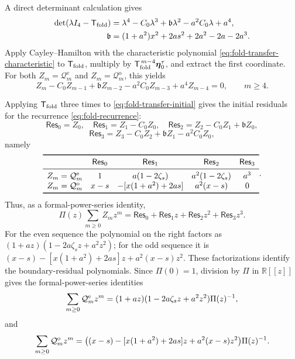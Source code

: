 \documentclass[11pt,a4paper]{article}
\numberwithin{equation}{section}
\begin{document}
A direct determinant calculation gives
\begin{equation}\label{eq:fold-transfer-characteristic}
\begin{aligned}
 \det(\lambda I_4-\mathsf T_{\rm fold})
 &=
 \lambda^4-C_0\lambda^3+\mathfrak b\lambda^2
 -a^2C_0\lambda+a^4,\\
 \mathfrak b
 &=(1+a^2)x^2+2as^2+2a^2-2a-2a^3.
\end{aligned}
\end{equation}
Apply Cayley--Hamilton with the characteristic polynomial
\eqref{eq:fold-transfer-characteristic} to \(\mathsf T_{\rm fold}\), multiply by
\(\mathsf T_{\rm fold}^{\,m-4}\boldsymbol\eta_0^\tau\), and extract the
first coordinate.  For both \(Z_m=\mathcal Q_m^{\mathrm e}\) and
\(Z_m=\mathcal Q_m^{\mathrm o}\), this yields
\begin{equation}\label{eq:fold-recurrence}
 Z_m-C_0Z_{m-1}+\mathfrak bZ_{m-2}
 -a^2C_0Z_{m-3}+a^4Z_{m-4}=0,
 \qquad m\geq4.
\end{equation}

Applying \(\mathsf T_{\rm fold}\) three times to
\eqref{eq:fold-transfer-initial} gives the initial residuals for the
recurrence \eqref{eq:fold-recurrence}:
\[
 \mathsf{Res}_0=Z_0,\quad
 \mathsf{Res}_1=Z_1-C_0Z_0,\quad
 \mathsf{Res}_2=Z_2-C_0Z_1+\mathfrak bZ_0,
\]
\[
 \mathsf{Res}_3
 =Z_3-C_0Z_2+\mathfrak bZ_1-a^2C_0Z_0,
\]
namely
\[
\begin{array}{ccccc}
 \toprule
 &\mathsf{Res}_0&\mathsf{Res}_1&\mathsf{Res}_2&\mathsf{Res}_3\\ \midrule
 Z_m=\mathcal Q_m^{\rm e}
 &1&a(1-2\zeta_s)&a^2(1-2\zeta_s)&a^3\\
 Z_m=\mathcal Q_m^{\rm o}
 &x-s&-[x(1+a^2)+2as]&a^2(x-s)&0\\
 \bottomrule
\end{array}.
\]
Thus, as a formal-power-series identity,
\[
 \Pi(z)\sum_{m\geq0}Z_mz^m
 =\mathsf{Res}_0+\mathsf{Res}_1z+\mathsf{Res}_2z^2+\mathsf{Res}_3z^3.
\]
For the even sequence the polynomial on the right factors as
\((1+az)(1-2a\zeta_sz+a^2z^2)\); for the odd sequence it is
\((x-s)-[x(1+a^2)+2as]z+a^2(x-s)z^2\).  These factorizations identify the
boundary-residual polynomials.  Since \(\Pi(0)=1\), division by \(\Pi\) in
\(\mathbb R[[z]]\) gives the formal-power-series identities
\begin{equation}\label{eq:fold-generating-even}
 \sum_{m\geq0}\mathcal Q_m^{\rm e}z^m
 =(1+az)(1-2a\zeta_sz+a^2z^2)\Pi(z)^{-1},
\end{equation}
and
\begin{equation}\label{eq:fold-generating-odd}
 \sum_{m\geq0}\mathcal Q_m^{\rm o}z^m
 =\bigl((x-s)-[x(1+a^2)+2as]z+a^2(x-s)z^2\bigr)
  \Pi(z)^{-1}.
\end{equation}
\end{document}
